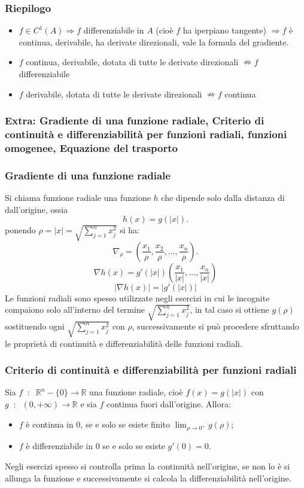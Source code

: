 \subsubsection{Riepilogo}
\begin{itemize}
    \item $f \in C^1(A) \Rightarrow f$ differenziabile in $A$ (cioè $f$ ha iperpiano tangente) $\Rightarrow f$ è continua, derivabile, ha derivate direzionali, vale la formula del gradiente.
    \item $f$ continua, derivabile, dotata di tutte le derivate direzionali $\nRightarrow f$ differenziabile
    \item $f$ derivabile, dotata di tutte le derivate direzionali $\nRightarrow f$ continua 
\end{itemize}
\subsubsection{Extra: Gradiente di una funzione radiale, Criterio di continuità e differenziabilità per funzioni radiali, funzioni omogenee, Equazione del trasporto}
\subsubsection*{Gradiente di una funzione radiale}
Si chiama funzione radiale una funzione $h$ che dipende solo dalla distanza di dall'origine, ossia
\[
    h(x) = g(|x|).
\]
ponendo $\rho = |x| = \sqrt{\sum_{j=1}^{n}x_j^2}$ si ha:
\[
    \nabla_\rho = ( \frac{x_1}{\rho}, \frac{x_2}{\rho}, \dots, \frac{x_n}{\rho}).
\]
\[
    \nabla h(x) = g'(|x|)( \frac{x_1}{|x|}, \dots, \frac{x_n}{|x|})
\]
\[
    |\nabla h(x)| = |g'(|x|)|
\]
Le funzioni radiali sono spesso utilizzate negli esercizi in cui le incognite compaiono solo all'interno del termine $\sqrt{\sum_{j=1}^{n}x_j^2}$, in tal caso si ottiene $g(\rho)$ sostituendo ogni $\sqrt{\sum_{j=1}^{n}x_j^2}$ con $ \rho$, successivamente si può procedere sfruttando le proprietà di continuità e differenziabilità delle funzioni radiali.
\subsubsection*{Criterio di continuità e differenziabilità per funzioni radiali}
Sia $f \;\;:\;\; \mathbb{R}^n-\{0\} \rightarrow  \mathbb{R}$ una funzione radiale, cioè $f(x) = g(|x|)$ con $g \;\;:\;\;(0, +\infty) \rightarrow \mathbb{R}$ e sia $f$ continua fuori dall'origine. Allora:
\begin{itemize}
    \item $f$ è continua in $0$, se e solo se esiste finito $\lim_{\rho\rightarrow 0^+}g(\rho)$;
    \item $f$ è differenziabile in $0$ se e solo se esiste $g'(0)=0$.
\end{itemize}
Negli esercizi spesso si controlla prima la continuità nell'origine, se non lo è si allunga la funzione e successivamente si calcola la differenziabilità nell'origine.\newline
